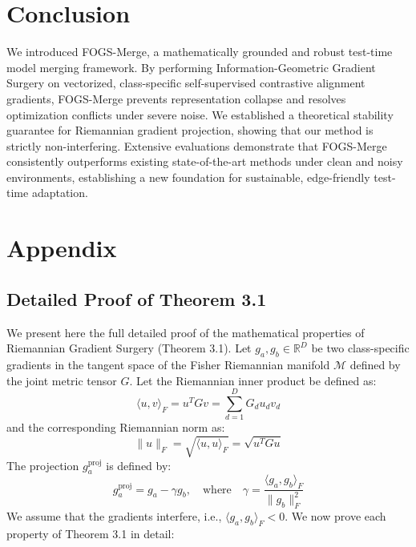 \documentclass{article}
\theoremstyle{plain}
\theoremstyle{definition}
\theoremstyle{remark}
\begin{document}
\section{Conclusion}
\label{sec:conclusion}
We introduced FOGS-Merge, a mathematically grounded and robust test-time model merging framework. By performing Information-Geometric Gradient Surgery on vectorized, class-specific self-supervised contrastive alignment gradients, FOGS-Merge prevents representation collapse and resolves optimization conflicts under severe noise. We established a theoretical stability guarantee for Riemannian gradient projection, showing that our method is strictly non-interfering. Extensive evaluations demonstrate that FOGS-Merge consistently outperforms existing state-of-the-art methods under clean and noisy environments, establishing a new foundation for sustainable, edge-friendly test-time adaptation.




\clearpage
\appendix
\section{Appendix}

\subsection{Detailed Proof of Theorem 3.1}
We present here the full detailed proof of the mathematical properties of Riemannian Gradient Surgery (Theorem 3.1).
Let $g_a, g_b \in \mathbb{R}^D$ be two class-specific gradients in the tangent space of the Fisher Riemannian manifold $\mathcal{M}$ defined by the joint metric tensor $G$. Let the Riemannian inner product be defined as:
\[
\langle u, v \rangle_F = u^T G v = \sum_{d=1}^D G_d u_d v_d
\]
and the corresponding Riemannian norm as:
\[
\|u\|_F = \sqrt{\langle u, u \rangle_F} = \sqrt{u^T G u}
\]
The projection $g_a^{\text{proj}}$ is defined by:
\[
g_a^{\text{proj}} = g_a - \gamma g_b, \quad \text{where} \quad \gamma = \frac{\langle g_a, g_b \rangle_F}{\|g_b\|_F^2}
\]
We assume that the gradients interfere, i.e., $\langle g_a, g_b \rangle_F < 0$. We now prove each property of Theorem 3.1 in detail:
\end{document}
